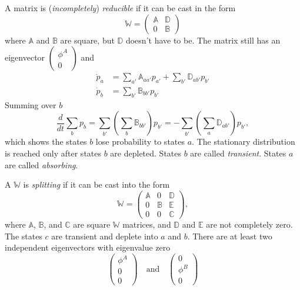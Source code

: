 \documentclass{book}
\numberwithin{equation}{section}
\theoremstyle{plain}
\theoremstyle{definition}
\theoremstyle{remark}
\theoremstyle{BoldStyle}
\numberwithin{exercise}{section}
\begin{document}
A matrix is (\emph{incompletely}) \emph{reducible}
if it can be cast in the form
\begin{equation}
  \mathbb W
  =
  \left(
  \begin{array}{ccc}
    \mathbb A   & \mathbb D     \\
    0           & \mathbb B
  \end{array}
  \right)
  \label{eq:W_reducible}
\end{equation}
%
where $\mathbb A$ and $\mathbb B$ are square,
but $\mathbb D$ doesn't have to be.
%
The matrix still has an eigenvector
$\left(\begin{array}{ccc} \phi^A \\ 0 \end{array}\right)$
and
\begin{equation}
  \begin{aligned}
    \dot p_a &= \sum_{a'} \mathbb A_{a a'} p_{a'}
              + \sum_{b'} \mathbb D_{a b'} p_{b'} \\
    \dot p_b &= \sum_{b'} \mathbb B_{b b'} p_{b'}
  \end{aligned}
\end{equation}
%
Summing over $b$
$$
\frac{d}{dt} \sum_b p_b = \sum_{b'} \left( \sum_{b} \mathbb B_{b b'} \right) p_{b'}
=
-\sum_{b'} \left( \sum_{a} \mathbb D_{ab'} \right) p_{b'},
$$
which shows the states $b$ lose probability to states $a$.
%
The stationary distribution is reached only after states $b$
are depleted.
%
States $b$ are called \emph{transient}.
%
States $a$ are called \emph{absorbing}.


A $\mathbb W$ is \emph{splitting} if it can be cast into the form
%
\begin{equation}
  \mathbb W
  =
  \left(
  \begin{array}{ccc}
    \mathbb A   & 0         & \mathbb D     \\
    0           & \mathbb B & \mathbb E     \\
    0           & 0         & \mathbb C
  \end{array}
  \right),
  \label{eq:W_splitting}
\end{equation}
%
where $\mathbb A$, $\mathbb B$, and $\mathbb C$
are square $\mathbb W$ matrices,
and $\mathbb D$ and $\mathbb E$ are not completely zero.
%
The states $c$ are transient and deplete into $a$ and $b$.
%
There are at least two independent eigenvectors with eigenvalue zero
$$
  \left(
  \begin{array}{lll}
    \phi^A  \\
    0       \\
    0
  \end{array}
  \right)
  \quad
  \mathrm{and}
  \quad
  \left(
  \begin{array}{lll}
    0       \\
    \phi^B  \\
    0
  \end{array}
  \right)
$$
\end{document}
